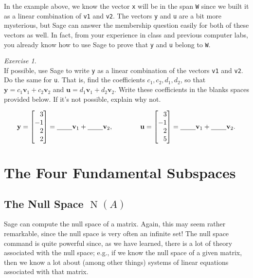 \documentclass[fleqn,11pt]{paper}
\theoremstyle{remark}
\newtheorem{exercise}{Exercise}
\renewcommand{\vec}[1]{\mathbf{#1}}
\newcommand{\<}{\ensuremath{\langle}}
\renewcommand{\>}{\ensuremath{\rangle}}
\newcommand\vu{\vec{u}}
\newcommand\vv{\vec{v}}
\newcommand\vy{\vec{y}}
\begin{document}
In the example above, we know the vector {\tt x} will be in the span {\tt W} since we built
it as a linear combination of {\tt v1} and {\tt v2}. The vectors {\tt y} and
{\tt u} are a bit more mysterious, but Sage
can answer the membership question easily for both of these vectors as well. 
In fact, from your experience in class and previous computer labs, you already know
how to use Sage to prove that {\tt y} and {\tt u} belong to {\tt W}.

\begin{exercise}~\\
  If possible, use Sage to write {\tt y} as a linear combination of the vectors {\tt v1} and 
  {\tt v2}. Do the same for {\tt u}. That is, find the coefficients $c_1, c_2, d_1, d_2$,
  so that $\vy = c_1\vv_1 +c_2 \vv_2$ and $\vu = d_1\vv_1 +d_2 \vv_2$. Write these coefficients
  in the blanks spaces provided below.  If it's not possible, explain why not.
\end{exercise}

\[
  \vy = \begin{bmatrix*}[r] 3 \\ -1 \\ 2 \\ 2\end{bmatrix*}= \text{\underline{\phantom{XXX}}}\vv_1 + \text{\underline{\phantom{XXX}}} \vv_2,
\qquad
\qquad
  \vu = \begin{bmatrix*}[r] 3 \\ -1 \\ 2 \\ 5\end{bmatrix*}= \text{\underline{\phantom{XXX}}}\vv_1 + \text{\underline{\phantom{XXX}}} \vv_2.
\]
\vskip5mm



\section{The Four Fundamental Subspaces}
\subsection{The Null Space $\operatorname{N}(A)$}
Sage can compute the null space of a matrix. Again, this may seem rather
remarkable, since the null space is very often an infinite set!
The null space command is quite powerful since, as we have learned,
there is a lot of theory associated with the null space; e.g., if we know
the null space of a given matrix, then we know a lot about (among other things)
systems of linear equations associated with that matrix.
\end{document}
